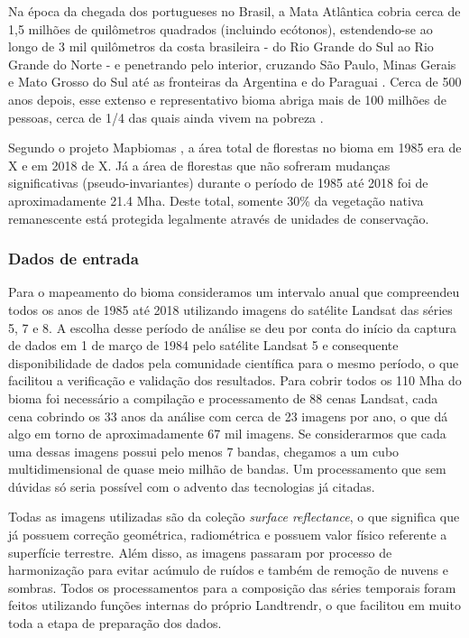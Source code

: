 Na época da chegada dos portugueses no Brasil, a Mata Atlântica cobria cerca de 1,5 milhões de quilômetros quadrados (incluindo ecótonos), estendendo-se ao longo de 3 mil quilômetros da costa brasileira - do Rio Grande do Sul ao Rio Grande do Norte - e penetrando pelo interior, cruzando São Paulo, Minas Gerais e Mato Grosso do Sul até as fronteiras da Argentina e do Paraguai \citep{scarano2014}. Cerca de 500 anos depois, esse extenso e representativo bioma abriga mais de 100 milhões de pessoas, cerca de 1/4 das quais ainda vivem na pobreza \citep{scarano2014}.

Segundo o projeto Mapbiomas \citep{Souza2019}, a área total de florestas no bioma em 1985 era de X e em 2018 de X. Já a área de florestas que não sofreram mudanças significativas (pseudo-invariantes) durante o período de 1985 até 2018 foi de aproximadamente 21.4 Mha. Deste total, somente  30\% da vegetação nativa remanescente está protegida legalmente através de unidades de conservação.


\subsubsection{Dados de entrada}
\hspace{13pt} Para o mapeamento do bioma consideramos um intervalo anual que compreendeu todos os anos de 1985 até 2018 utilizando imagens do satélite Landsat das séries 5, 7 e 8. A escolha desse período de análise se deu por conta do início da captura de dados em 1 de março de 1984 pelo satélite Landsat 5 e consequente disponibilidade de dados pela comunidade científica para o mesmo período, o que facilitou a verificação e validação dos resultados. Para cobrir todos os 110 Mha do bioma foi necessário a compilação e processamento de 88 cenas Landsat, cada cena cobrindo os 33 anos da análise com cerca de 23 imagens por ano, o que dá algo em torno de aproximadamente 67 mil imagens. Se considerarmos que cada uma dessas imagens possui pelo menos 7 bandas, chegamos a um cubo multidimensional de quase meio milhão de bandas. Um processamento que sem dúvidas só seria possível com o advento das tecnologias já citadas.

Todas as imagens utilizadas são da coleção \emph{surface reflectance}, o que significa que já possuem correção geométrica, radiométrica e possuem valor físico referente a superfície terrestre. Além disso, as imagens passaram por processo de harmonização para evitar acúmulo de ruídos e também de remoção de nuvens e sombras. Todos os processamentos para a composição das séries temporais foram feitos utilizando funções internas do próprio Landtrendr, o que facilitou em muito toda a etapa de preparação dos dados.

